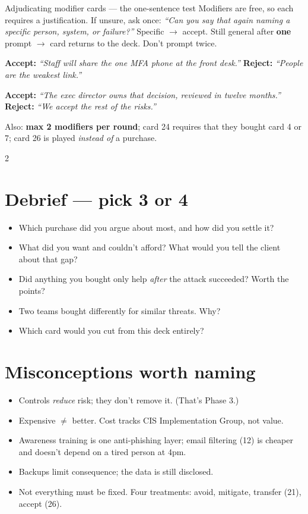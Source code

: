 \documentclass[9pt,letterpaper]{extarticle}
\newcommand{\say}[1]{\textit{``#1''}}
\begin{document}
\vspace{0.3em}
\begin{graybox}{Adjudicating modifier cards --- the one-sentence test}
Modifiers are free, so each requires a justification. If unsure, ask once:
\say{Can you say that again naming a specific person, system, or failure?}
Specific $\rightarrow$ accept. Still general after \textbf{one} prompt
$\rightarrow$ card returns to the deck. Don't prompt twice.
\vspace{0.3em}

\textbf{Accept:} \say{Staff will share the one MFA phone at the front desk.}
\quad \textbf{Reject:} \say{People are the weakest link.}
\vspace{0.2em}

\textbf{Accept:} \say{The exec director owns that decision, reviewed in twelve
months.} \quad \textbf{Reject:} \say{We accept the rest of the risks.}
\vspace{0.3em}

Also: \textbf{max 2 modifiers per round}; card 24 requires that they bought card
4 or 7; card 26 is played \emph{instead of} a purchase.
\end{graybox}

\vspace{0.3em}
\begin{multicols}{2}
\section{Debrief --- pick 3 or 4}
\begin{itemize}
\item Which purchase did you argue about most, and how did you settle it?
\item What did you want and couldn't afford? What would you tell the client
about that gap?
\item Did anything you bought only help \emph{after} the attack succeeded? Worth
the points?
\item Two teams bought differently for similar threats. Why?
\item Which card would you cut from this deck entirely?
\end{itemize}

\columnbreak

\section{Misconceptions worth naming}
\begin{itemize}
\item Controls \emph{reduce} risk; they don't remove it. (That's Phase 3.)
\item Expensive $\neq$ better. Cost tracks CIS Implementation Group, not value.
\item Awareness training is one anti-phishing layer; email filtering (12) is
cheaper and doesn't depend on a tired person at 4pm.
\item Backups limit consequence; the data is still disclosed.
\item Not everything must be fixed. Four treatments: avoid, mitigate, transfer
(21), accept (26).
\end{itemize}
\end{multicols}
\end{document}

